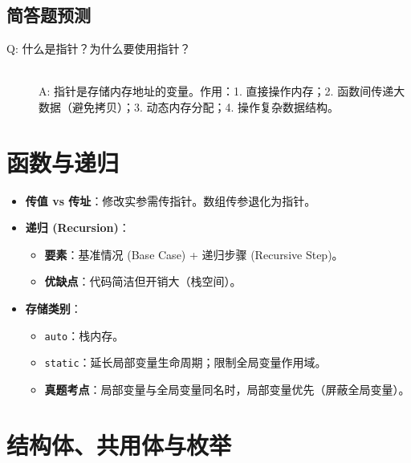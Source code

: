 \documentclass[a4paper,12pt]{article}
\begin{document}
\subsection{简答题预测}
\begin{description}
    \item[Q: 什么是指针？为什么要使用指针？] \hfill \\
    A: 指针是存储内存地址的变量。作用：1. 直接操作内存；2. 函数间传递大数据（避免拷贝）；3. 动态内存分配；4. 操作复杂数据结构。
\end{description}

\section{函数与递归}

\begin{itemize}
    \item \textbf{传值 vs 传址}：修改实参需传指针。数组传参退化为指针。
    \item \textbf{递归 (Recursion)}：
    \begin{itemize}
        \item \textbf{要素}：基准情况 (Base Case) + 递归步骤 (Recursive Step)。
        \item \textbf{优缺点}：代码简洁但开销大（栈空间）。
    \end{itemize}
    \item \textbf{存储类别}：
    \begin{itemize}
        \item \texttt{auto}：栈内存。
        \item \texttt{static}：延长局部变量生命周期；限制全局变量作用域。
        \item \textbf{真题考点}：局部变量与全局变量同名时，局部变量优先（屏蔽全局变量）。
    \end{itemize}
\end{itemize}

\section{结构体、共用体与枚举}
\end{document}
